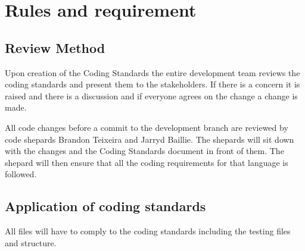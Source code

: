\documentclass[11pt]{article}
\begin{document}
	\section{Rules and requirement}
	\subsection{Review Method}
	Upon creation of the Coding Standards the entire development team reviews the coding standards and present them to the stakeholders. If there is a concern it is raised and there is a discussion and if everyone agrees on the change a change is made.
	
	All code changes before a commit to the development branch are reviewed by code shepards Brandon Teixeira and Jarryd Baillie. The shepards will sit down with the changes and the Coding Standards document in front of them. The shepard will then ensure that all the coding requirements for that language is followed.
	
	\subsection{Application of coding standards}
	All files will have to comply to the coding standards including the testing files and structure.
	
	\newpage
	
\end{document}
